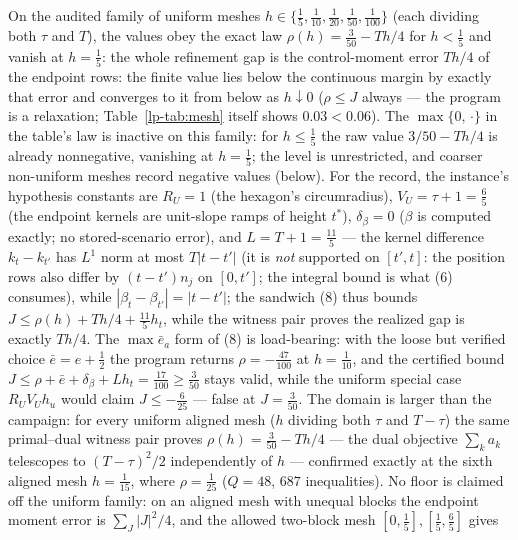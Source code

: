 \documentclass[10pt,twocolumn]{article}
\theoremstyle{plain}
\theoremstyle{definition}
\theoremstyle{remark}
\begin{document}
On the audited family of uniform meshes \(h \in \{\tfrac15,
\tfrac1{10}, \tfrac1{20}, \tfrac1{50}, \tfrac1{100}\}\) (each dividing
both \(\tau\) and \(T\)), the values obey the exact law \(\rho(h) =
\tfrac{3}{50} - Th/4\) for \(h < \tfrac15\) and vanish at \(h =
\tfrac15\): the whole refinement gap is the control-moment error \(Th/4\)
of the endpoint rows: the finite value lies below the continuous margin by
exactly that error and converges to it from below as \(h \downarrow 0\)
(\(\rho \le J\) always --- the program is a relaxation; Table~\ref{lp-tab:mesh}
itself shows \(0.03 < 0.06\)). The \(\max\{0,\,\cdot\}\) in the
table's law is inactive on this family: for \(h \le \tfrac15\) the raw
value \(3/50 - Th/4\) is already nonnegative, vanishing at
\(h = \tfrac15\); the level is unrestricted, and coarser non-uniform
meshes record negative values (below).
For the record, the instance's hypothesis constants are
\(R_U = 1\) (the hexagon's circumradius), \(V_U = \tau + 1 = \tfrac65\)
(the endpoint kernels are unit-slope ramps of height \(t^{*}\)),
\(\delta_\beta = 0\) (\(\beta\) is computed exactly; no stored-scenario
error), and \(L = T + 1 = \tfrac{11}{5}\) --- the kernel difference \(k_t - k_{t'}\) has \(L^1\) norm at most
\(T|t - t'|\) (it is \emph{not} supported on \([t', t]\): the position
rows also differ by \((t - t')n_j\) on \([0, t']\); the integral bound is
what (6) consumes), while \(|\beta_t - \beta_{t'}| = |t - t'|\); the
sandwich (8) thus bounds \(J \le \rho(h) + Th/4 + \tfrac{11}{5}
h_t\), while the witness pair proves the realized gap is exactly
\(Th/4\). The \(\max \bar{e}_a\) form of (8) is load-bearing: with the
loose but verified choice \(\bar{e} = e + \tfrac12\) the program returns
\(\rho = -\tfrac{47}{100}\) at \(h = \tfrac1{10}\), and the certified bound \(J \le \rho + \bar{e} + \delta_\beta + L h_t = \tfrac{17}{100}
\ge \tfrac3{50}\) stays valid, while the uniform special case
\(R_U V_U h_u\) would claim \(J \le -\tfrac{6}{25}\) --- false at
\(J = \tfrac3{50}\). The domain is larger than the campaign: for every uniform aligned mesh
(\(h\) dividing both \(\tau\) and \(T - \tau\)) the same primal--dual
witness pair proves \(\rho(h) = \tfrac{3}{50} - Th/4\) --- the dual
objective \(\sum_k a_k\) telescopes to \((T-\tau)^2/2\) independently of
\(h\) --- confirmed exactly at the sixth aligned mesh \(h = \tfrac1{15}\),
where \(\rho = \tfrac1{25}\) (\(Q = 48\), \(687\) inequalities). No
floor is claimed off the uniform family: on an aligned mesh with unequal
blocks the endpoint moment error is \(\sum_J |J|^2/4\), and the allowed
two-block mesh \([0, \tfrac15], [\tfrac15, \tfrac65]\) gives
\end{document}
